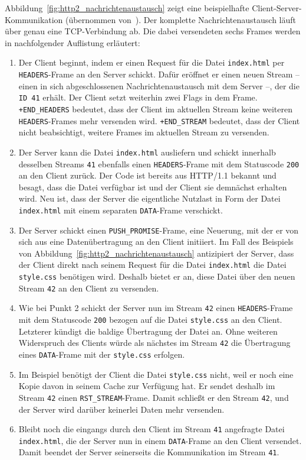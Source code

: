\documentclass[a4paper, justified, notoc]{tufte-handout} %
\begin{document}
Abbildung~\ref{fig:http2_nachrichtenaustausch} zeigt eine beispielhafte Client-Server-Kommunikation (übernommen von~\citep{weinschenkler:2017}). Der komplette Nachrichtenaustausch läuft über genau eine TCP-Verbindung ab. Die dabei versendeten sechs Frames werden in nachfolgender Auflistung erläutert:

\begin{enumerate}
	\item Der Client beginnt, indem er einen Request für die Datei \texttt{index.html} per \texttt{HEADERS}-Frame an den Server schickt. Dafür eröffnet er einen neuen Stream -- einen in sich abgeschlossenen Nachrichtenaustausch mit dem Server --, der die \texttt{ID 41} erhält. Der Client setzt weiterhin zwei Flags in dem Frame. \texttt{+END\_HEADERS} bedeutet, dass der Client im aktuellen Stream keine weiteren \texttt{HEADERS}-Frames mehr versenden wird. \texttt{+END\_STREAM} bedeutet, dass der Client nicht beabsichtigt, weitere Frames im aktuellen Stream zu versenden.
	\item Der Server kann die Datei \texttt{index.html} ausliefern und schickt innerhalb desselben Streams \texttt{41} ebenfalls einen \texttt{HEADERS}-Frame mit dem Statuscode \texttt{200} an den Client zurück. Der Code ist bereits aus HTTP/1.1 bekannt und besagt, dass die Datei verfügbar ist und der Client sie demnächst erhalten wird. Neu ist, dass der Server die eigentliche Nutzlast in Form der Datei \texttt{index.html} mit einem separaten \texttt{DATA}-Frame verschickt.
	\item Der Server schickt einen \texttt{PUSH\_PROMISE}-Frame, eine Neuerung, mit der er von sich aus eine Datenübertragung an den Client initiiert. Im Fall des Beispiels von Abbildung~\ref{fig:http2_nachrichtenaustausch} antizipiert der Server, dass der Client direkt nach seinem Request für die Datei \texttt{index.html} die Datei \texttt{style.css} benötigen wird. Deshalb bietet er an, diese Datei über den neuen Stream \texttt{42} an den Client zu versenden.
	\item Wie bei Punkt 2 schickt der Server nun im Stream \texttt{42} einen \texttt{HEADERS}-Frame mit dem Statuscode \texttt{200} bezogen auf die Datei \texttt{style.css} an den Client. Letzterer kündigt die baldige Übertragung der Datei an. Ohne weiteren Widerspruch des Clients würde als nächstes im Stream \texttt{42} die Übertragung eines \texttt{DATA}-Frame mit der \texttt{style.css} erfolgen.
	\item Im Beispiel benötigt der Client die Datei \texttt{style.css} nicht, weil er noch eine Kopie davon in seinem Cache zur Verfügung hat. Er sendet deshalb im Stream \texttt{42} einen \texttt{RST\_STREAM}-Frame. Damit schließt er den Stream \texttt{42}, und der Server wird darüber keinerlei Daten mehr versenden.
	\item Bleibt noch die eingangs durch den Client im Stream \texttt{41} angefragte Datei \texttt{index.html}, die der Server nun in einem \texttt{DATA}-Frame an den Client versendet. Damit beendet der Server seinerseits die Kommunikation im Stream \texttt{41}.
\end{enumerate}
\end{document}
